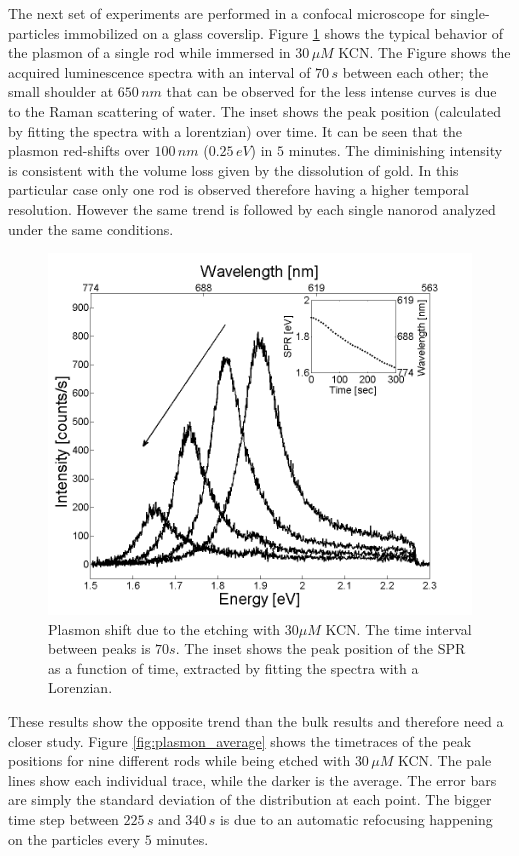 \documentclass[twocolumn]{article}
\begin{document}
The next set of experiments are performed in a confocal microscope for
single-particles immobilized on a glass coverslip. Figure
\ref{fig:plasmon_single_rod} shows the typical behavior of the plasmon of a
single rod while immersed in $30\,\mu M$ KCN. The Figure shows the acquired
luminescence spectra with an interval of $70\,s$ between each other; the small
shoulder at $650\,nm$ that can be observed for the less intense curves is due to
the Raman scattering of water. The inset shows the peak position (calculated by
fitting the spectra with a lorentzian) over time. It can be seen that the
plasmon red-shifts over $100\, nm$ ($0.25\, eV$) in $5$ minutes. The diminishing
intensity is consistent with the volume loss given by the dissolution of gold.
In this particular case only one rod is observed therefore having a higher
temporal resolution. However the same trend is followed by each single nanorod
analyzed under the same conditions.


\begin{figure}[hbt]
 \centering
 \includegraphics[width=0.95\linewidth]{plasmon_single_rod.png}
 \caption{Plasmon shift due to the etching with $30\mu M$ KCN. The time
 interval between peaks is $70s$. The inset shows the peak position of the SPR as a
 function of time, extracted by fitting the spectra with a Lorenzian.}
 \label{fig:plasmon_single_rod}
\end{figure}

These results show the opposite trend than the bulk results and therefore need a
closer study. Figure \ref{fig:plasmon_average} shows the timetraces of the peak
positions for nine different rods while being etched with $30\,\mu M$ KCN. The
pale lines show each individual trace, while the darker is the average. The error
bars are simply the standard deviation of the distribution at each point. The
bigger time step between $225\,s$ and $340\,s$ is due to an automatic refocusing
happening on the particles every $5$ minutes.
\end{document}

